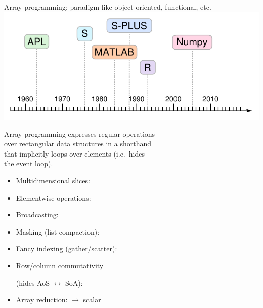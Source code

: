 \documentclass[aspectratio=169]{beamer}
\begin{document}
\begin{frame}[fragile]{Array programming: paradigm like object oriented, functional, etc.}
\vspace{0.15 cm}
\hfill \mbox{\includegraphics[height=2.75 cm]{apl-timeline.pdf}\hspace{-0.5 cm}}

\vspace{-2.3 cm}
Array programming expresses regular operations \\
over rectangular data structures in a shorthand \\
that implicitly loops over elements (i.e.\ hides \\
the event loop).

\vspace{0.3 cm}
\begin{itemize}\setlength{\itemsep}{0.15 cm}
\item Multidimensional slices: 
\item Elementwise operations: 
\item Broadcasting: 
\item Masking (list compaction): 
\item Fancy indexing (gather/scatter): 
\item Row/column commutativity 

(hides AoS $\leftrightarrow$ SoA): 
\item Array reduction:  $\to$ scalar
\end{itemize}
\end{frame}
\end{document}
